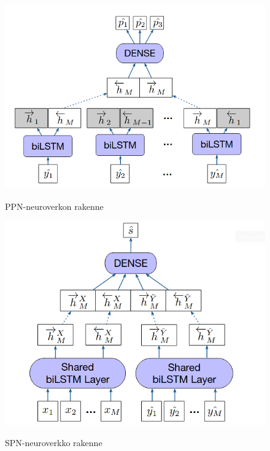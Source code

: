 \documentclass[finnish,twoside,censored,tkt,sw-line]{HYthesisML}
\begin{document}
\begin{figure}[!ht]
    \centering
    \begin{minipage}[b]{0.4\textwidth}
        \centering
        \includegraphics[width=\textwidth]{cmg-property-prediction-network.png}
        \caption{PPN-neuroverkon rakenne}
        {\cite{ShinBonggun}}
        {\label{fig:cmg-model-ppn}}
    \end{minipage}
    \hfill
    \begin{minipage}[b]{0.4\textwidth}
        \centering
        \includegraphics[width=\textwidth]{cmg-similarity-network.png}
        \caption{SPN-neuroverkko rakenne}
        {\cite{ShinBonggun}}
        {\label{fig:cmg-model-spn}}
    \end{minipage}
\end{figure}
\end{document}
